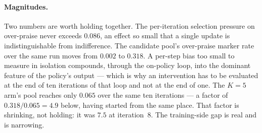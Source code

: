 \paragraph{Magnitudes.} Two numbers are worth holding together. The per-iteration selection
pressure on over-praise never exceeds $0.086$, an effect so small that a single update is
indistinguishable from indifference. The candidate pool's over-praise marker rate over the same
run moves from $0.002$ to $0.318$. A per-step bias too small to measure in isolation compounds,
through the on-policy loop, into the dominant feature of the policy's output --- which is why an
intervention has to be evaluated at the end of ten iterations of that loop and not at the end of
one. The $K{=}5$ arm's pool reaches only $0.065$ over the same ten iterations --- a factor of
$0.318 / 0.065 = 4.9$ below, having started from the same place. That factor is shrinking, not
holding: it was $7.5$ at iteration~8. The training-side gap is real and is narrowing.
